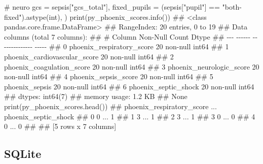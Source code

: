 \documentclass[
  letterpaper,
  DIV=11,
  numbers=noendperiod]{scrartcl}
\newenvironment{Shaded}{\begin{snugshade}}{\end{snugshade}}
\newcommand{\BuiltInTok}[1]{\textcolor[rgb]{0.00,0.23,0.31}{#1}}
\newcommand{\CommentTok}[1]{\textcolor[rgb]{0.37,0.37,0.37}{#1}}
\newcommand{\NormalTok}[1]{\textcolor[rgb]{0.00,0.23,0.31}{#1}}
\newcommand{\OperatorTok}[1]{\textcolor[rgb]{0.37,0.37,0.37}{#1}}
\newcommand{\StringTok}[1]{\textcolor[rgb]{0.13,0.47,0.30}{#1}}
\begin{document}
\begin{Shaded}
\begin{Highlighting}[]
    \CommentTok{\# neuro}
\NormalTok{    gcs }\OperatorTok{=}\NormalTok{ sepsis[}\StringTok{"gcs\_total"}\NormalTok{],}
\NormalTok{    fixed\_pupils }\OperatorTok{=}\NormalTok{ (sepsis[}\StringTok{"pupil"}\NormalTok{] }\OperatorTok{==} \StringTok{"both{-}fixed"}\NormalTok{).astype(}\BuiltInTok{int}\NormalTok{),}
\NormalTok{    )}
\BuiltInTok{print}\NormalTok{(py\_phoenix\_scores.info())}
\CommentTok{\#\# \textless{}class \textquotesingle{}pandas.core.frame.DataFrame\textquotesingle{}\textgreater{}}
\CommentTok{\#\# RangeIndex: 20 entries, 0 to 19}
\CommentTok{\#\# Data columns (total 7 columns):}
\CommentTok{\#\#  \#   Column                        Non{-}Null Count  Dtype}
\CommentTok{\#\# {-}{-}{-}  {-}{-}{-}{-}{-}{-}                        {-}{-}{-}{-}{-}{-}{-}{-}{-}{-}{-}{-}{-}{-}  {-}{-}{-}{-}{-}}
\CommentTok{\#\#  0   phoenix\_respiratory\_score     20 non{-}null     int64}
\CommentTok{\#\#  1   phoenix\_cardiovascular\_score  20 non{-}null     int64}
\CommentTok{\#\#  2   phoenix\_coagulation\_score     20 non{-}null     int64}
\CommentTok{\#\#  3   phoenix\_neurologic\_score      20 non{-}null     int64}
\CommentTok{\#\#  4   phoenix\_sepsis\_score          20 non{-}null     int64}
\CommentTok{\#\#  5   phoenix\_sepsis                20 non{-}null     int64}
\CommentTok{\#\#  6   phoenix\_septic\_shock          20 non{-}null     int64}
\CommentTok{\#\# dtypes: int64(7)}
\CommentTok{\#\# memory usage: 1.2 KB}
\CommentTok{\#\# None}
\BuiltInTok{print}\NormalTok{(py\_phoenix\_scores.head())}
\CommentTok{\#\#    phoenix\_respiratory\_score  ...  phoenix\_septic\_shock}
\CommentTok{\#\# 0                          0  ...                     1}
\CommentTok{\#\# 1                          3  ...                     1}
\CommentTok{\#\# 2                          3  ...                     1}
\CommentTok{\#\# 3                          0  ...                     0}
\CommentTok{\#\# 4                          0  ...                     0}
\CommentTok{\#\# }
\CommentTok{\#\# [5 rows x 7 columns]}
\end{Highlighting}
\end{Shaded}

\subsection{SQLite}\label{sqlite-8}
\end{document}
